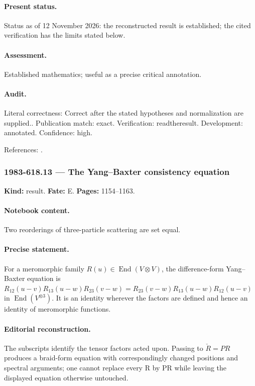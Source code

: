 \paragraph{Present status.} Status as of 12 November 2026: the reconstructed result is established; the cited verification has the limits stated below.

\paragraph{Assessment.} Established mathematics; useful as a precise critical annotation.

\paragraph{Audit.} Literal correctness: Correct after the stated hypotheses and normalization are supplied.. Publication match: exact. Verification: readtheresult. Development: annotated. Confidence: high.

\noindent References: \citep{yang1967manybody,yang1968smatrix}.\par

\subsubsection{1983-618.13 --- The Yang--Baxter consistency equation}

\label{item:1983-618.13}

\noindent\textbf{Kind:} result. \textbf{Fate:} E. \textbf{Pages:} 1154--1163.\par

\paragraph{Notebook content.} Two reorderings of three-particle scattering are set equal.

\paragraph{Precise statement.} For a meromorphic family $R(u)\in\operatorname{End}(V\otimes V)$, the difference-form Yang--Baxter equation is $R_{12}(u-v)R_{13}(u-w)R_{23}(v-w)=R_{23}(v-w)R_{13}(u-w)R_{12}(u-v)$ in $\operatorname{End}(V^{\otimes3})$. It is an identity wherever the factors are defined and hence an identity of meromorphic functions.

\paragraph{Editorial reconstruction.} The subscripts identify the tensor factors acted upon. Passing to $\check R=PR$ produces a braid-form equation with correspondingly changed positions and spectral arguments; one cannot replace every R by PR while leaving the displayed equation otherwise untouched.

